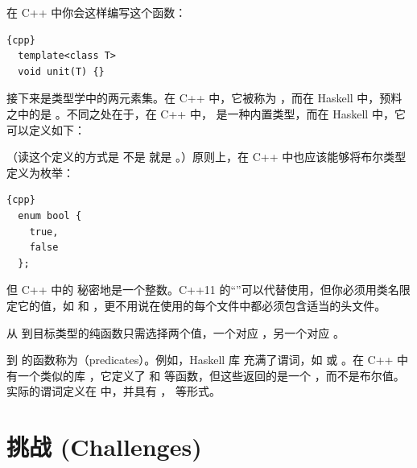 在 C++ 中你会这样编写这个函数：

\begin{lstlisting}{cpp}
  template<class T>
  void unit(T) {}
\end{lstlisting}
接下来是类型学中的两元素集。在 C++ 中，它被称为 ，而在 Haskell 中，预料之中的是 。不同之处在于，在 C++ 中， 是一种内置类型，而在 Haskell 中，它可以定义如下：

（读这个定义的方式是  不是  就是 。）原则上，在 C++ 中也应该能够将布尔类型定义为枚举：

\begin{lstlisting}{cpp}
  enum bool {
    true,
    false
  };
\end{lstlisting}
但 C++ 中的  秘密地是一个整数。C++11 的“”可以代替使用，但你必须用类名限定它的值，如  和 ，更不用说在使用的每个文件中都必须包含适当的头文件。

从  到目标类型的纯函数只需选择两个值，一个对应 ，另一个对应 。

到  的函数称为（predicates）。例如，Haskell 库  充满了谓词，如  或 。在 C++ 中有一个类似的库 \code{}，它定义了  和  等函数，但这些返回的是一个 ，而不是布尔值。实际的谓词定义在  中，并具有 ， 等形式。

\section{挑战 (Challenges)}

